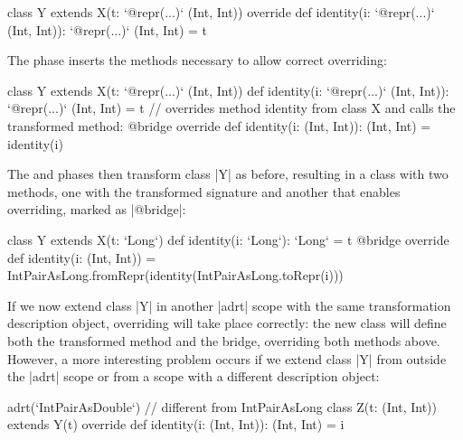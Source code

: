 \begin{lstlisting-nobreak}
class Y extends X(t: `@repr(...)` (Int, Int)) {
  override def identity(i: `@repr(...)` (Int, Int)): `@repr(...)` (Int, Int) = t
}
\end{lstlisting-nobreak}

The \bridge{} phase inserts the methods necessary to allow correct overriding:

\begin{lstlisting-nobreak}
class Y extends X(t: `@repr(...)` (Int, Int)) {
  def identity(i: `@repr(...)` (Int, Int)): `@repr(...)` (Int, Int) = t
  // overrides method identity from class X and calls the transformed method:
  @bridge override def identity(i: (Int, Int)): (Int, Int) = identity(i)
}
\end{lstlisting-nobreak}

The \coerce{} and \commit{} phases then transform class |Y| as before, resulting in a class with two methods, one with the transformed signature and another that enables overriding, marked as |@bridge|:

\begin{lstlisting-nobreak}
class Y extends X(t: `Long`) {
  def identity(i: `Long`): `Long` = t
  @bridge override def identity(i: (Int, Int)) =
    IntPairAsLong.fromRepr(identity(IntPairAsLong.toRepr(i)))
}
\end{lstlisting-nobreak}

If we now extend class |Y| in another |adrt| scope with the same transformation description object, overriding will take place correctly: the new class will define both the transformed method and the bridge, overriding both methods above. However, a more interesting problem occurs if we extend class |Y| from outside the |adrt| scope or from a scope with a different description object:

\begin{lstlisting-nobreak}
adrt(`IntPairAsDouble`) { // different from IntPairAsLong
  class Z(t: (Int, Int)) extends Y(t) {
    override def identity(i: (Int, Int)): (Int, Int) = i
  }
}
\end{lstlisting-nobreak}

%
%

